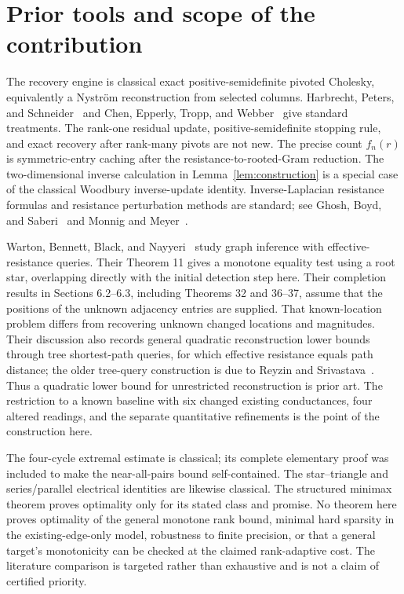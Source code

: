 \documentclass[11pt,letterpaper]{article}
\begin{document}
\section{Prior tools and scope of the contribution}
The recovery engine is classical exact positive-semidefinite pivoted Cholesky, equivalently a Nystr\"om reconstruction from selected columns. Harbrecht, Peters, and Schneider~\cite{HPS} and Chen, Epperly, Tropp, and Webber~\cite{CETW} give standard treatments. The rank-one residual update, positive-semidefinite stopping rule, and exact recovery after rank-many pivots are not new. The precise count $f_n(r)$ is symmetric-entry caching after the resistance-to-rooted-Gram reduction. The two-dimensional inverse calculation in Lemma~\ref{lem:construction} is a special case of the classical Woodbury inverse-update identity. Inverse-Laplacian resistance formulas and resistance perturbation methods are standard; see Ghosh, Boyd, and Saberi~\cite{GBS} and Monnig and Meyer~\cite{MM}.

Warton, Bennett, Black, and Nayyeri~\cite{WBBN} study graph inference with effective-resistance queries. Their Theorem 11 gives a monotone equality test using a root star, overlapping directly with the initial detection step here. Their completion results in Sections 6.2--6.3, including Theorems 32 and 36--37, assume that the positions of the unknown adjacency entries are supplied. That known-location problem differs from recovering unknown changed locations and magnitudes. Their discussion also records general quadratic reconstruction lower bounds through tree shortest-path queries, for which effective resistance equals path distance; the older tree-query construction is due to Reyzin and Srivastava~\cite{RS}. Thus a quadratic lower bound for unrestricted reconstruction is prior art. The restriction to a known baseline with six changed existing conductances, four altered readings, and the separate quantitative refinements is the point of the construction here.

The four-cycle extremal estimate is classical; its complete elementary proof was included to make the near-all-pairs bound self-contained. The star--triangle and series/parallel electrical identities are likewise classical. The structured minimax theorem proves optimality only for its stated class and promise. No theorem here proves optimality of the general monotone rank bound, minimal hard sparsity in the existing-edge-only model, robustness to finite precision, or that a general target's monotonicity can be checked at the claimed rank-adaptive cost. The literature comparison is targeted rather than exhaustive and is not a claim of certified priority.
\end{document}

